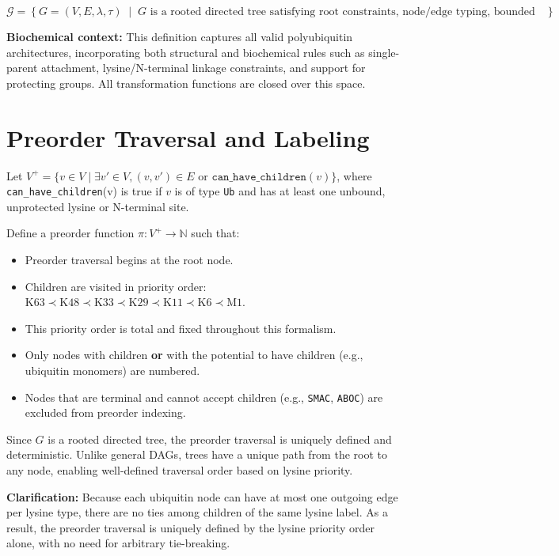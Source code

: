 \documentclass[12pt]{article}
\begin{document}
\[
\mathcal{G} = \left\{ G = (V, E, \lambda, \tau) \;\middle|\; G \text{ is a rooted directed tree satisfying root constraints, node/edge typing, bounded degrees, and label uniqueness} \right\}
\]

\textbf{Biochemical context:} This definition captures all valid polyubiquitin architectures, incorporating both structural and biochemical rules such as single-parent attachment, lysine/N-terminal linkage constraints, and support for protecting groups. All transformation functions are closed over this space.

\section{Preorder Traversal and Labeling}

Let $V^+ = \{ v \in V \mid \exists v' \in V, (v, v') \in E \text{ or } \texttt{can\_have\_children}(v)\}$, where \texttt{can\_have\_children}(v) is true if $v$ is of type \texttt{Ub} and has at least one unbound, unprotected lysine or N-terminal site.

Define a preorder function $\pi : V^+ \to \mathbb{N}$ such that:
\begin{itemize}
    \item Preorder traversal begins at the root node.
    \item Children are visited in priority order: $\text{K63} \prec \text{K48} \prec \text{K33} \prec \text{K29} \prec \text{K11} \prec \text{K6} \prec \text{M1}$.
    \item This priority order is total and fixed throughout this formalism.
    \item Only nodes with children \textbf{or} with the potential to have children (e.g., ubiquitin monomers) are numbered.
    \item Nodes that are terminal and cannot accept children (e.g., \texttt{SMAC}, \texttt{ABOC}) are excluded from preorder indexing.
\end{itemize}


Since $G$ is a rooted directed tree, the preorder traversal is uniquely defined and deterministic. Unlike general DAGs, trees have a unique path from the root to any node, enabling well-defined traversal order based on lysine priority.

\vspace{0.5em}
\textbf{Clarification:} Because each ubiquitin node can have at most one outgoing edge per lysine type, there are no ties among children of the same lysine label. As a result, the preorder traversal is uniquely defined by the lysine priority order alone, with no need for arbitrary tie-breaking.
\end{document}
